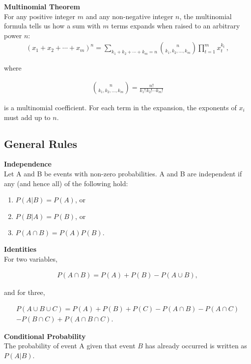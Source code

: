 \documentclass{article}
\numberwithin{theorem}{subsection}
\numberwithin{theorem}{subsubsection}
\numberwithin{lemma}{subsection}
\numberwithin{lemma}{subsubsection}
\theoremstyle{definition}
\numberwithin{definition}{subsection}
\numberwithin{definition}{subsubsection}
\begin{document}
\noindent \textbf{Multinomial Theorem} \\
\indent For any positive integer $m$ and any non-negative integer $n$, the multinomial formula tells us how a sum with $m$ terms expands when raised to an arbitrary power $n$:
\begin{gather*}
    (x_1 + x_2  + \cdots + x_m)^n = \sum_{k_1+k_2+\cdots+k_m=n} {n \choose k_1, k_2, \ldots, k_m} \prod_{t=1}^m x_t^{k_t}\,,
\end{gather*}

\noindent where

\begin{gather*}
    {n \choose k_1, k_2, \ldots, k_m} = \frac{n!}{k_1!\, k_2! \cdots k_m!}
\end{gather*}

\noindent is a multinomial coefficient. For each term in the expansion, the exponents of $x_{i}$ must add up to $n$. 

\subsection{General Rules}

\noindent \textbf{Independence} \\
\indent Let A and B be events with non-zero probabilities. A and B are independent if any (and hence all) of the following hold:
\begin{enumerate}
    \item $P(A|B) = P(A)$, or
    \item $P(B|A) = P(B)$, or
    \item $P(A \cap B) = P(A)P(B)$.
\end{enumerate}

\noindent \textbf{Identities} \\
\indent For two variables,

\begin{gather*}
    P(A \cap B) = P(A) + P(B) - P(A \cup B),
\end{gather*}

\noindent and for three,

\begin{gather*}
    P(A \cup B \cup C) = P(A) + P(B) + P(C) - P(A \cap B) - P(A \cap C) \\ - P(B \cap C) + P(A \cap B \cap C).
\end{gather*}

\noindent \textbf{Conditional Probability} \\
\indent The probability of event A given that event $B$ has already occurred is written as $P(A|B)$.
\end{document}
